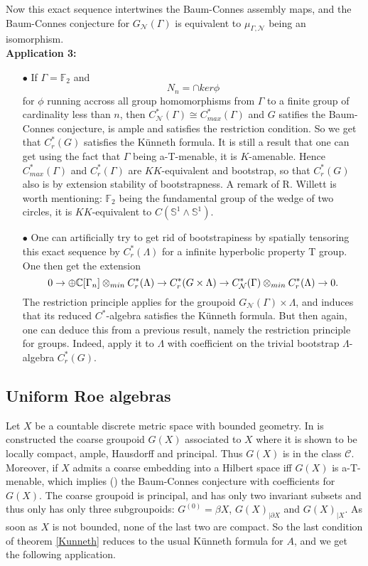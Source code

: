 Now this exact sequence intertwines the Baum-Connes assembly maps, and the Baum-Connes conjecture for $G_{\mathcal N}(\Gamma)$ is equivalent to $\mu_{\Gamma,\mathcal N}$ being an isomorphism. \\

\textbf{Application 3:} 
\begin{itemize}
\item[$\bullet$] If $\Gamma= \mathbb F_2$ and 
\[N_n = \cap ker \phi \]
for $\phi$ running accross all group homomorphisms from $\Gamma$ to a finite group of cardinality less than $n$, then $C_{\mathcal N}^*(\Gamma) \cong C_{max}^*(\Gamma)$ and $G$ satifies the Baum-Connes conjecture, is ample and satisfies the restriction condition. So we get that $C_r^*(G)$ satisfies the Künneth formula. It is still a result that one can get using the fact that $\Gamma$ being a-T-menable, it is $K$-amenable. Hence $C^*_{max}(\Gamma)$ and $C_r^*(\Gamma)$ are $KK$-equivalent and bootstrap, so that $C_r^*(G)$ also is by extension stability of bootstrapness. A remark of R. Willett is worth mentioning: $\mathbb F_2$ being the fundamental group of the wedge of two circles, it is $KK$-equivalent to $C(\mathbb S^1 \wedge \mathbb S^1)$.\\
\item[$\bullet$] One can artificially try to get rid of bootstrapiness by spatially tensoring this exact sequence by $C_r^*(\Lambda)$ for a infinite hyperbolic property T group. One then get the extension
\[ 0 \rightarrow \oplus \mathbb C[\Gamma_n] \otimes_{min} C_r^*(\Lambda) \rightarrow C_r^*(G\times \Lambda) \rightarrow C^*_{\mathcal N} (\Gamma)\otimes_{min} C_r^*(\Lambda)   \rightarrow 0.\]
The restriction principle applies for the groupoid $G_{\mathcal N}(\Gamma)\times\Lambda$, and induces that its reduced $C^*$-algebra satisfies the Künneth formula. But then again, one can deduce this from a previous result, namely the restriction principle for groups. Indeed, apply it to $\Lambda$ with coefficient on the trivial bootstrap $\Lambda$-algebra $C_r^*(G)$.	\\ 
\end{itemize} 


\subsection{Uniform Roe algebras}

Let $X$ be a countable discrete metric space with bounded geometry. In \cite{SkTuYu} is constructed the coarse groupoid $G(X)$ associated to $X$ where it is shown to be locally compact, ample, Hausdorff and principal. Thus $G(X)$ is in the class $\mathcal C$. Moreover, if $X$ admits a coarse embedding into a Hilbert space iff $G(X)$ is a-T-menable, which implies (\cite{TuThese}) the Baum-Connes conjecture with coefficients for $G(X)$. The coarse groupoid is principal, and has only two invariant subsets and thus only has only three subgroupoids: $G^{(0)}= \beta X$, $G(X)_{|\partial X}$ and $G(X)_{|X}$. As soon as $X$ is not bounded, none of the last two are compact. So the last condition of theorem \ref{Kunneth} reduces to the usual Künneth formula for $A$, and we get the following application. \\

